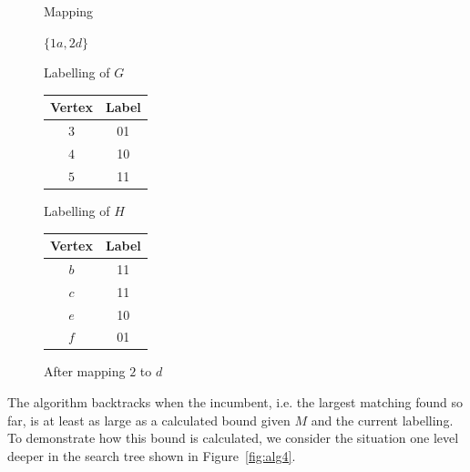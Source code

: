 \documentclass[letterpaper]{article}
\begin{document}
\begin{figure}[ht]
\centering
\begin{minipage}[t]{0.15\linewidth}
    Mapping

    \bigskip

    $\{1a, 2d\}$
\end{minipage}
\quad
\begin{minipage}[t]{0.3\linewidth}
    Labelling of $G$
    \begin{tabular}[t]{cc}
    \hline
        Vertex & Label\\
    \hline
        $3$ & 01 \\
        $4$ & 10 \\
        $5$ & 11 \\
    \hline
    \end{tabular}
\end{minipage}
\quad
\begin{minipage}[t]{0.3\linewidth}
    Labelling of $H$
    \begin{tabular}[t]{cc}
    \hline
        Vertex & Label\\
    \hline
        $b$ & 11 \\
        $c$ & 11 \\
        $e$ & 10 \\
        $f$ & 01 \\
    \hline
    \end{tabular}
\end{minipage}
\caption{After mapping $2$ to $d$}
\label{fig:alg3}
\end{figure}

The algorithm backtracks when the incumbent, i.e. the largest matching found so far, is at least as large
as a calculated bound given $M$ and the current labelling. To demonstrate how
this bound is calculated, we consider the situation one level deeper in the
search tree shown in Figure~\ref{fig:alg4}.
\end{document}

